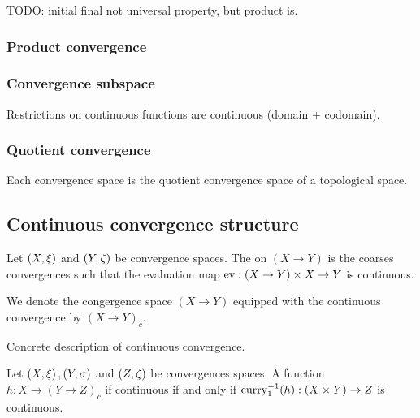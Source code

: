 TODO: initial final not universal property, but product is.

\subsubsection{Product convergence}

\subsubsection{Convergence subspace}

\begin{lemma}
Restrictions on continuous functions are continuous (domain + codomain).
\end{lemma}

\subsubsection{Quotient convergence}
\begin{proposition}
Each convergence space is the quotient convergence space of a topological space.
\end{proposition}

\subsection{Continuous convergence structure}
\begin{definition}
Let $\left( X,\xi \right)$ and $\left( Y,\zeta \right)$ be convergence spaces. The  on $(X \to Y)$ is the coarses convergences such that the evaluation map $\operatorname{ev}: (X\to Y)\times X \to Y$ is continuous.

We denote the congergence space $(X\to Y)$ equipped with the continuous convergence by $(X\to Y)_c$.
\end{definition}

\begin{proposition}
Concrete description of continuous convergence.
\end{proposition}

\begin{proposition} \label{universalPropertyContinuousConvergence}
Let $\left( X, \xi \right), \left( Y,\sigma \right)$ and $\left( Z,\zeta \right)$ be convergences spaces. A function $h: X\to (Y \to Z)_c$ if continuous \textup{if and only if} $\operatorname{curry}_1^{-1}(h): (X\times Y)\to Z$ is continuous.
\end{proposition}

